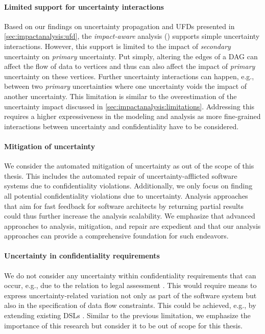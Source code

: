 \paragraph{Limited support for uncertainty interactions}
Based on our findings on uncertainty propagation and \acp{UFD} presented in \autoref{sec:impactanalysis:ufd}, the \emph{impact-aware} analysis () supports simple uncertainty interactions.
However, this support is limited to the impact of \emph{secondary} uncertainty on \emph{primary} uncertainty.
Put simply, altering the edges of a \ac{DAG} can affect the flow of data to vertices and thus can also affect the impact of \emph{primary} uncertainty on these vertices.
Further uncertainty interactions can happen, e.g., between two \emph{primary} uncertainties where one uncertainty voids the impact of another uncertainty.
This limitation is similar to the overestimation of the uncertainty impact discussed in \autoref{sec:impactanalysis:limitations}.
Addressing this requires a higher expressiveness in the modeling and analysis as more fine-grained interactions between uncertainty and confidentiality have to be considered.

\paragraph{Mitigation of uncertainty}
We consider the automated mitigation of uncertainty as out of the scope of this thesis.
This includes the automated repair of uncertainty-afflicted software systems due to confidentiality violations.
Additionally, we only focus on finding all potential confidentiality violations due to uncertainty.
Analysis approaches that aim for fast feedback for software architects by returning partial results could thus further increase the analysis scalability.
We emphasize that advanced approaches to analysis, mitigation, and repair are expedient and that our analysis approaches can provide a comprehensive foundation for such endeavors. 

\paragraph{Uncertainty in confidentiality requirements}
We do not consider any uncertainty within confidentiality requirements that can occur, e.g., due to the relation to legal assessment \cite{boltz_model-based_2022}.
This would require means to express uncertainty-related variation not only as part of the software system but also in the specification of data flow constraints.
This could be achieved, e.g., by extending existing \acfp{DSL} \cite{hahner_modeling_2021,boltz_extensible_2024}.
Similar to the previous limitation, we emphasize the importance of this research but consider it to be out of scope for this thesis.





